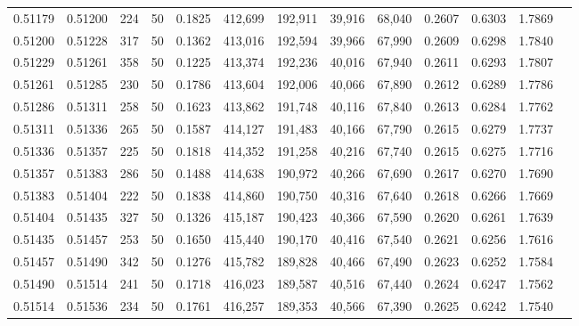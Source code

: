 \begin{tabular}{rrrrrrrrrrrrr}
0.51179 & 0.51200 &   224 &  50 &                                     0.1825 & 412,699 & 192,911 &  39,916 &  68,040 & 0.2607 & 0.6303 & 1.7869 \\
0.51200 & 0.51228 &   317 &  50 &                                     0.1362 & 413,016 & 192,594 &  39,966 &  67,990 & 0.2609 & 0.6298 & 1.7840 \\
0.51229 & 0.51261 &   358 &  50 &                                     0.1225 & 413,374 & 192,236 &  40,016 &  67,940 & 0.2611 & 0.6293 & 1.7807 \\
0.51261 & 0.51285 &   230 &  50 &                                     0.1786 & 413,604 & 192,006 &  40,066 &  67,890 & 0.2612 & 0.6289 & 1.7786 \\
0.51286 & 0.51311 &   258 &  50 &                                     0.1623 & 413,862 & 191,748 &  40,116 &  67,840 & 0.2613 & 0.6284 & 1.7762 \\
0.51311 & 0.51336 &   265 &  50 &                                     0.1587 & 414,127 & 191,483 &  40,166 &  67,790 & 0.2615 & 0.6279 & 1.7737 \\
0.51336 & 0.51357 &   225 &  50 &                                     0.1818 & 414,352 & 191,258 &  40,216 &  67,740 & 0.2615 & 0.6275 & 1.7716 \\
0.51357 & 0.51383 &   286 &  50 &                                     0.1488 & 414,638 & 190,972 &  40,266 &  67,690 & 0.2617 & 0.6270 & 1.7690 \\
0.51383 & 0.51404 &   222 &  50 &                                     0.1838 & 414,860 & 190,750 &  40,316 &  67,640 & 0.2618 & 0.6266 & 1.7669 \\
0.51404 & 0.51435 &   327 &  50 &                                     0.1326 & 415,187 & 190,423 &  40,366 &  67,590 & 0.2620 & 0.6261 & 1.7639 \\
0.51435 & 0.51457 &   253 &  50 &                                     0.1650 & 415,440 & 190,170 &  40,416 &  67,540 & 0.2621 & 0.6256 & 1.7616 \\
0.51457 & 0.51490 &   342 &  50 &                                     0.1276 & 415,782 & 189,828 &  40,466 &  67,490 & 0.2623 & 0.6252 & 1.7584 \\
0.51490 & 0.51514 &   241 &  50 &                                     0.1718 & 416,023 & 189,587 &  40,516 &  67,440 & 0.2624 & 0.6247 & 1.7562 \\
0.51514 & 0.51536 &   234 &  50 &                                     0.1761 & 416,257 & 189,353 &  40,566 &  67,390 & 0.2625 & 0.6242 & 1.7540 \\

\end{tabular}
